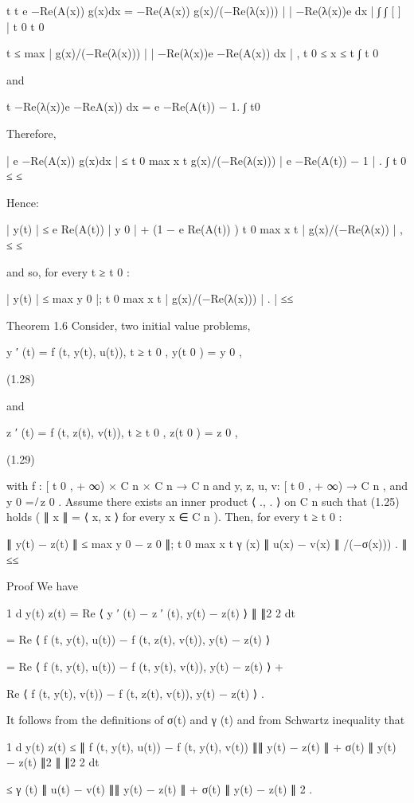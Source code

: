 \documentclass[12pt]{article}
\begin{document}
t t e −Re(A(x)) g(x)dx = −Re(A(x)) g(x)/(−Re(λ(x))) | | −Re(λ(x))e dx | ∫ ∫ [ ] | t 0 t 0

t ≤ max {| g(x)/(−Re(λ(x))) |} | −Re(λ(x))e −Re(A(x)) dx | , t 0 ≤ x ≤ t ∫ t 0

and

t −Re(λ(x))e −ReA(x)) dx = e −Re(A(t)) − 1. ∫ t0 

Therefore,

| e −Re(A(x)) g(x)dx | ≤ t 0 max x t { g(x)/(−Re(λ(x))) } | e −Re(A(t)) − 1 | . ∫ t 0 ≤ ≤

Hence:

| y(t) | ≤ e Re(A(t)) | y 0 | + (1 − e Re(A(t)) ) t 0 max x t | g(x)/(−Re(λ(x)) | , ≤ ≤

and so, for every t ≥ t 0 :

| y(t) | ≤ max y 0 |; t 0 max x t | g(x)/(−Re(λ(x))) | . | { ≤≤ }

Theorem 1.6 Consider, two initial value problems,

y ′ (t) = f (t, y(t), u(t)), t ≥ t 0 , y(t 0 ) = y 0 ,

(1.28)

and

z ′ (t) = f (t, z(t), v(t)), t ≥ t 0 , z(t 0 ) = z 0 ,

(1.29)

with f : [ t 0 , + ∞) × C n × C n → C n and y, z, u, v: [ t 0 , + ∞) → C n , and y 0 = ̸ z 0 . Assume there exists an inner product ⟨ ., . 
⟩ on C n such that (1.25) holds ( ∥ x ∥ = ⟨ x, x ⟩ for every x ∈ C n ). Then, for every t ≥ t 0 :

∥ y(t) − z(t) ∥ ≤ max y 0 − z 0 ∥; t 0 max x t { γ (x) ∥ u(x) − v(x) ∥ /(−σ(x))) } . ∥ { ≤≤ }

Proof We have

1 d y(t) z(t) = Re ⟨ y ′ (t) − z ′ (t), y(t) − z(t) ⟩ ∥ ∥2  2 dt

= Re ⟨ f (t, y(t), u(t)) − f (t, z(t), v(t)), y(t) − z(t) ⟩

= Re ⟨ f (t, y(t), u(t)) − f (t, y(t), v(t)), y(t) − z(t) ⟩ +

Re ⟨ f (t, y(t), v(t)) − f (t, z(t), v(t)), y(t) − z(t) ⟩ .

It follows from the deﬁnitions of σ(t) and γ (t) and from Schwartz inequality that

1 d y(t) z(t) ≤ ∥ f (t, y(t), u(t)) − f (t, y(t), v(t)) ∥∥ y(t) − z(t) ∥ + σ(t) ∥ y(t) − z(t) ∥2  ∥ ∥2  2 dt

≤ γ (t) ∥ u(t) − v(t) ∥∥ y(t) − z(t) ∥ + σ(t) ∥ y(t) − z(t) ∥ 2 .
\end{document}
